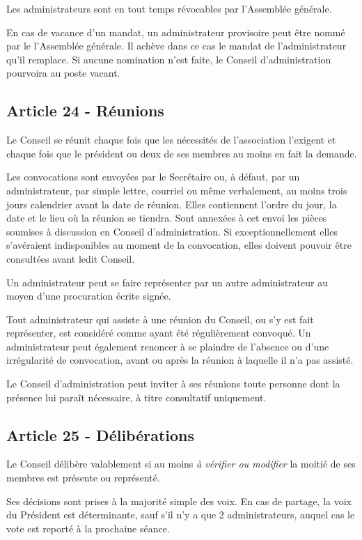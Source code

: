 \documentclass[12pt]{article}
\begin{document}
Les administrateurs sont en tout temps révocables par l'Assemblée générale.

En cas de vacance d'un mandat, un administrateur provisoire peut être nommé par le l'Assemblée générale. Il achève dans ce cas le mandat de l'administrateur qu'il remplace. Si aucune nomination n'est faite, le Conseil d'administration pourvoira au poste vacant.
\subsection*{Article 24 - Réunions}
Le Conseil se réunit chaque fois que les nécessités de l'association l'exigent et chaque fois que le président ou deux de ses membres au moins en fait la demande.

Les convocations sont envoyées par le Secrétaire ou, à défaut, par un administrateur, par simple lettre, courriel ou même verbalement, au moins trois jours calendrier avant la date de réunion. Elles contiennent l'ordre du jour, la date et le lieu où la réunion se tiendra. Sont annexées à cet envoi les pièces soumises à discussion en Conseil d'administration. Si exceptionnellement elles s'avéraient indisponibles au moment de la convocation, elles doivent pouvoir être consultées avant ledit Conseil.

Un administrateur peut se faire représenter par un autre administrateur au moyen d'une procuration écrite signée.

Tout administrateur qui assiste à une réunion du Conseil, ou s'y est fait représenter, est considéré comme ayant été régulièrement convoqué. Un administrateur peut également renoncer à se plaindre de l'absence ou d'une irrégularité de convocation, avant ou après la réunion à laquelle il n'a pas assisté.

Le Conseil d'administration peut inviter à ses réunions toute personne dont la présence lui paraît nécessaire, à titre consultatif uniquement.

\subsection*{Article 25 - Délibérations}
Le Conseil délibère valablement si au moins \emph{à vérifier ou modifier} la moitié de ses membres est présente ou représenté.

Ses décisions sont prises à la majorité simple des voix. En cas de partage, la voix du Président est déterminante, sauf s'il n'y a que 2 administrateurs, auquel cas le vote est reporté à la prochaine séance.
\end{document}
